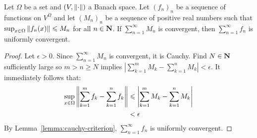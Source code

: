 \documentclass[11pt,twoside,openany]{memoir}
\begin{document}
    \begin{theorem}
        Let $\Omega$ be a set and $(V,\left\lVert \cdot \right\rVert)$ a Banach space. Let $(f_n)_n$ be a sequence of functions on $V^\Omega$ and let $(M_n)_n$ be a sequence of positive real numbers such that $\sup_{x \in \Omega} \left\lVert f_n(x) \right\rVert \leqslant M_n$ for all $n \in \mathbf{N}$. If $\sum_{n = 1}^\infty M_n$ is convergent, then $\sum_{n = 1}^\infty f_n$ is uniformly convergent. 
    \end{theorem}
        \begin{proof}
            Let $\epsilon > 0$. Since $\sum_{n = 1}^\infty M_n$ is convergent, it is Cauchy. Find $N \in \mathbf{N}$ sufficiently large so $m > n \geq N$ implies $\left|\sum_{k = 1}^m M_k - \sum_{k = 1}^n M_k\right| < \epsilon$. It immediately follows that:
                \begin{equation*}
                \begin{split}
                    \sup_{x \in \Omega}\left\lVert \sum_{k = 1}^m f_k - \sum_{k = 1}^n f_k \right\rVert &\leqslant \left|\sum_{k = 1}^m M_k - \sum_{k = 1}^n M_k\right| \\
                    & < \epsilon
                \end{split}
                \end{equation*}
            By Lemma~\ref{lemma:cauchy-criterion}, $\sum_{n = 1}^\infty f_n$ is uniformly convergent.
        \end{proof}
    
\end{document}
